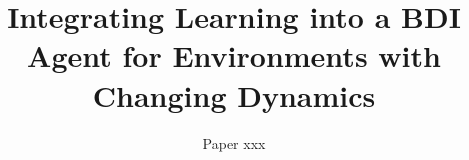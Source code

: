 \documentclass{article}
\title{Integrating Learning into a BDI Agent for Environments with Changing Dynamics}
\author{
Paper xxx
}
\begin{document}
\maketitle

\begin{abstract}

\end{abstract}









\small


\end{document}
